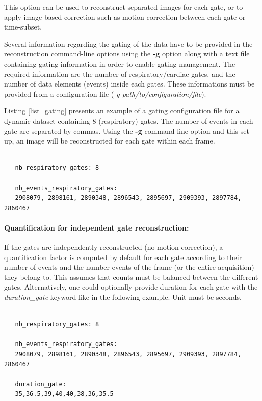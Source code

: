 \documentclass[a4paper, 11pt]{article}
\begin{document}

This option can be used to reconstruct separated images for each gate, or to apply image-based correction such as motion correction between each gate or time-subset.

Several information regarding the gating of the data have to be provided in the reconstruction command-line options using the \textbf{-g} option  along with a text file containing gating information in order to enable gating management. The required information are the number of respiratory/cardiac gates, and the number of data elements (events) inside each gates. These informations must be provided from a configuration file (\textit{-g path/to/configuration/file}). 

Listing \ref{list_gating} presents an example of a gating configuration file for a dynamic dataset containing 8 (respiratory) gates. The number of events in each gate are separated by commas. Using the \textbf{-g} command-line option and this set up, an image will be reconstructed for each gate within each frame.


\begin{lstlisting}[label={list_gating},caption= Setup of a gating file related to a dynamic dataset with respiratory gating.]

   nb_respiratory_gates: 8
   
   nb_events_respiratory_gates: 
   2908079, 2898161, 2890348, 2896543, 2895697, 2909393, 2897784, 2860467

\end{lstlisting}    


\paragraph{Quantification for independent gate reconstruction:} If the gates are independently reconstructed (no motion correction), a quantification factor is computed by default for each gate according to their number of events and the number events of the frame (or the entire acquisition) they belong to. This assumes that counts must be balanced between the different gates. Alternatively, one could optionally provide duration for each gate with the \textit{duration\_gate} keyword like in the following example. Unit must be seconds.

\begin{lstlisting}[label={list_gating},caption= Setup of a gating file related to a dynamic dataset with respiratory gating.]

   nb_respiratory_gates: 8
   
   nb_events_respiratory_gates: 
   2908079, 2898161, 2890348, 2896543, 2895697, 2909393, 2897784, 2860467

   duration_gate: 
   35,36.5,39,40,40,38,36,35.5
\end{lstlisting}    
\end{document}
